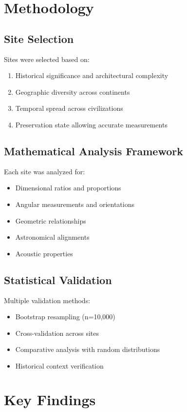 \documentclass[12pt,a4paper]{article}
\begin{document}
\section{Methodology}

\subsection{Site Selection}

Sites were selected based on:
\begin{enumerate}
    \item Historical significance and architectural complexity
    \item Geographic diversity across continents
    \item Temporal spread across civilizations
    \item Preservation state allowing accurate measurements
\end{enumerate}

\subsection{Mathematical Analysis Framework}

Each site was analyzed for:
\begin{itemize}
    \item Dimensional ratios and proportions
    \item Angular measurements and orientations
    \item Geometric relationships
    \item Astronomical alignments
    \item Acoustic properties
\end{itemize}

\subsection{Statistical Validation}

Multiple validation methods:
\begin{itemize}
    \item Bootstrap resampling (n=10,000)
    \item Cross-validation across sites
    \item Comparative analysis with random distributions
    \item Historical context verification
\end{itemize}

\section{Key Findings}
\end{document}
